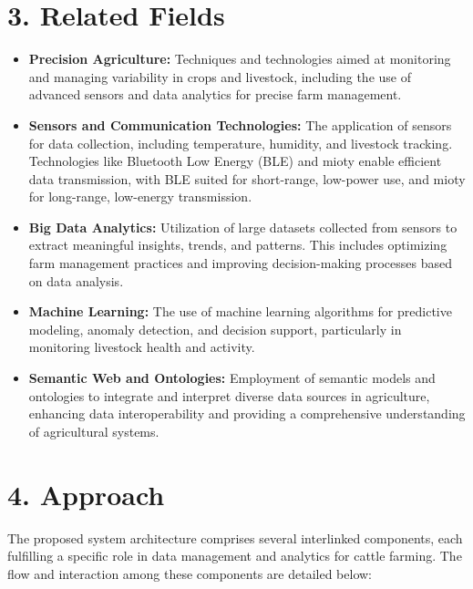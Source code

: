 \documentclass[11pt]{article}
\begin{document}
\section*{3. Related Fields}
\begin{itemize}
    \item \textbf{Precision Agriculture:} Techniques and technologies aimed at monitoring and managing variability in crops and livestock, including the use of advanced sensors and data analytics for precise farm management.
    \item \textbf{Sensors and Communication Technologies:} The application of sensors for data collection, including temperature, humidity, and livestock tracking. Technologies like Bluetooth Low Energy (BLE) and mioty enable efficient data transmission, with BLE suited for short-range, low-power use, and mioty for long-range, low-energy transmission.
    \item \textbf{Big Data Analytics:} Utilization of large datasets collected from sensors to extract meaningful insights, trends, and patterns. This includes optimizing farm management practices and improving decision-making processes based on data analysis.
    \item \textbf{Machine Learning:} The use of machine learning algorithms for predictive modeling, anomaly detection, and decision support, particularly in monitoring livestock health and activity.
    \item \textbf{Semantic Web and Ontologies:} Employment of semantic models and ontologies to integrate and interpret diverse data sources in agriculture, enhancing data interoperability and providing a comprehensive understanding of agricultural systems.
\end{itemize}

\section*{4. Approach}
The proposed system architecture comprises several interlinked components, each fulfilling a specific role in data management and analytics for cattle farming. The flow and interaction among these components are detailed below:
\end{document}
